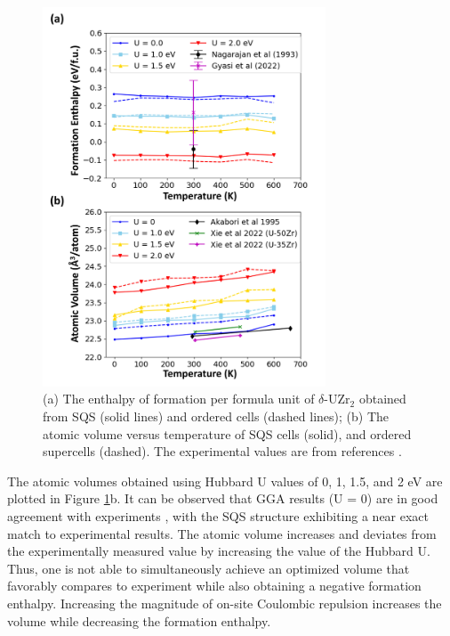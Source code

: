 \documentclass[preprint,12pt]{elsarticle}
\begin{document}
\begin{figure}[h!]
    \centering
    \includegraphics[width=0.75\textwidth]{H__Vol.jpg}
    \caption{(a) The enthalpy of formation per formula unit of $\delta$-UZr$_2$ obtained from SQS (solid lines) and ordered cells (dashed lines); (b) The atomic volume versus temperature of SQS cells (solid), and ordered supercells (dashed). The experimental values are from references \cite{akabori_lattice_1995, nagarajan_enthalpy_1993,xie_phase_2022, gyasi_about_2022}.}
    \label{fig:1}
\end{figure}

The atomic volumes obtained using Hubbard U values of 0, 1, 1.5, and 2 eV are plotted in Figure \ref{fig:1}b. It can be observed that GGA results (U = 0) are in good agreement with experiments \cite{akabori_lattice_1995, xie_phase_2022}, with the SQS structure exhibiting a near exact match to experimental results. The atomic volume increases and deviates from the experimentally measured value by increasing the value of the Hubbard U. Thus, one is not able to simultaneously achieve an optimized volume that favorably compares to experiment while also obtaining a negative formation enthalpy. Increasing the magnitude of on-site Coulombic repulsion increases the volume while decreasing the formation enthalpy. 
\end{document}
